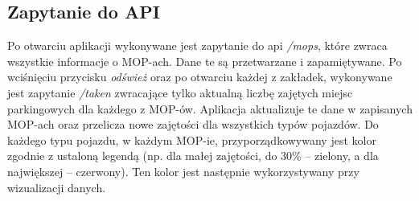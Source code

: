 \subsection{Zapytanie do API}
Po otwarciu aplikacji wykonywane jest zapytanie do \acrshort{api} \textit{/mops}, które zwraca wszystkie informacje o MOP-ach. Dane te są przetwarzane i zapamiętywane.
Po wciśnięciu przycisku \textit{odśwież} oraz po otwarciu każdej z zakładek, wykonywane jest zapytanie \textit{/taken} zwracające tylko aktualną liczbę zajętych miejsc parkingowych dla każdego z MOP-ów. Aplikacja aktualizuje te dane w zapisanych MOP-ach oraz przelicza nowe zajętości dla wszystkich typów pojazdów.
Do każdego typu pojazdu, w każdym MOP-ie, przyporządkowywany jest kolor zgodnie z ustaloną legendą (np. dla małej zajętości, do 30\% -- zielony, a dla największej -- czerwony). Ten kolor jest następnie wykorzystywany przy wizualizacji danych.

